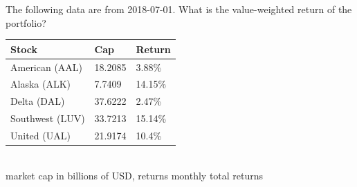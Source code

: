 The following data are from 2018-07-01. What is the value-weighted return of the portfolio?
\begin{center}
	\begin{tabular}{l|ll}
		\textbf{Stock} & \textbf{Cap} & \textbf{Return} \\ \hline
		American (AAL) & 18.2085 & 3.88\% \\
		Alaska (ALK) & 7.7409 & 14.15\% \\
		Delta (DAL) & 37.6222 & 2.47\% \\
		Southwest (LUV) & 33.7213 & 15.14\% \\
		United (UAL) & 21.9174 & 10.4\%\\\hline
	\end{tabular}\\
	{\footnotesize market cap in billions of USD, returns monthly total returns}
\end{center}
